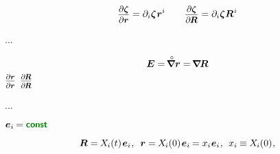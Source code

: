 \[
\scalebox{0.9}{$ \displaystyle \frac{\raisemath{-0.2em}{\partial \bm{\zeta}}}{\partial \bm{r}} $} = \partial_i \bm{\zeta} \hspace{.1ex} \bm{r}^i
\hspace{2em}
\scalebox{0.9}{$ \displaystyle \frac{\raisemath{-0.2em}{\partial \bm{\zeta}}}{\partial \hspace{-0.15ex} \bm{R}} $} = \partial_i \bm{\zeta} \bm{R}^{\hspace{.1ex}i}
\]



...

\nopagebreak\vspace{-0.2em}\begin{equation*}
\bm{E}
= \tikzmark{unitTensorAsOriginalDerivativeBegin} \hspace{-0.25ex} \boldnablacircled \bm{r} \tikzmark{unitTensorAsOriginalDerivativeEnd}
= \tikzmark{unitTensorAsCurrentDerivativeBegin} \hspace{-0.25ex} \boldnabla \hspace{-0.16ex} \bm{R} \tikzmark{unitTensorAsCurrentDerivativeEnd}
\end{equation*}%
%
{${ \scalebox{0.8}{$ \displaystyle \frac{\raisemath{-0.2em}{\partial \bm{r}}}{\partial \bm{r}} $} }$}%
%
{${ \scalebox{0.8}{$ \displaystyle \frac{\raisemath{-0.2em}{\partial \hspace{-0.15ex} \bm{R}}}{\partial \hspace{-0.15ex} \bm{R}} $} }$}

...

  ${\bm{e}_i \hspace{-0.16ex} = \boldconst}$

\nopagebreak\vspace{-0.2em}\begin{equation*}
\bm{R} = \hspace{-0.15ex} X_{\hspace{-0.1ex}i}(t) \hspace{.2ex} \bm{e}_i
\hspace{.1ex} , \:\;
\bm{r} = \hspace{-0.15ex} X_{\hspace{-0.1ex}i}(0) \hspace{.2ex} \bm{e}_i \hspace{-0.16ex} = x_i \hspace{.1ex} \bm{e}_i
\hspace{.1ex} , \:\:
x_i \hspace{-0.1ex} \equiv \hspace{-0.1ex} X_{\hspace{-0.1ex}i}(0)
\hspace{.1ex} ,
\end{equation*}

